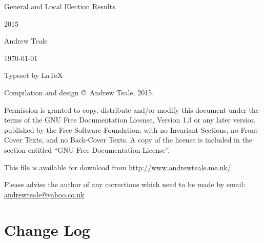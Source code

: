 \documentclass[a4paper,openany]{book}
\begin{document}

\begin{titlepage}

\begin{center}

\Huge General and Local Election Results

2015

\bigskip

\Large Andrew Teale

\vfill

\newcommand\versionno{0.10.1}


\today

\end{center}

\end{titlepage}


\begin{center}

\bigskip

Typeset by \LaTeX{} 

\bigskip

Compilation and design \copyright\ Andrew Teale, 2015.

 Permission is granted to copy, distribute and/or modify this document
 under the terms of the GNU Free Documentation License, Version 1.3
 or any later version published by the Free Software Foundation;
 with no Invariant Sections, no Front-Cover Texts, and no Back-Cover Texts.
 A copy of the license is included in the section entitled ``GNU
 Free Documentation License''.

\bigskip

This file is available for download from
\url{http://www.andrewteale.me.uk/}

\bigskip

Please advise the author of any corrections which need to be made by
email: \url{andrewteale@yahoo.co.uk}

\vfill
\end{center}

\section*{Change Log}


%
\end{document}
